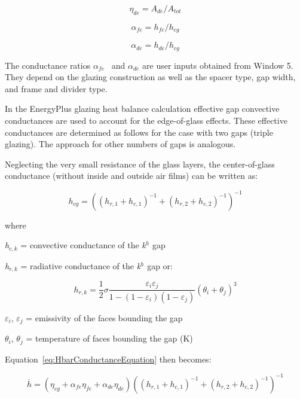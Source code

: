 \begin{equation}
{\eta_{de}} = {A_{de}}/{A_{tot}}
\end{equation}

\begin{equation}
{\alpha_{fe}} = {h_{fe}}/{h_{cg}}
\end{equation}

\begin{equation}
{\alpha_{de}} = {h_{de}}/{h_{cg}}
\end{equation}

The conductance ratios \({\alpha_{fe}}\) ~and \({\alpha_{de}}\) are user inputs obtained from Window 5. They depend on the glazing construction as well as the spacer type, gap width, and frame and divider type.

In the EnergyPlus glazing heat balance calculation effective gap convective conductances are used to account for the edge-of-glass effects. These effective conductances are determined as follows for the case with two gaps (triple glazing). The approach for other numbers of gaps is analogous.

Neglecting the very small resistance of the glass layers, the center-of-glass conductance (without inside and outside air films) can be written as:

\begin{equation}
{h_{cg}} = {\left( {{{\left( {{h_{r,1}} + {h_{c,1}}} \right)}^{ - 1}} + {{\left( {{h_{r,2}} + {h_{c,2}}} \right)}^{ - 1}}} \right)^{ - 1}}
\end{equation}

where

\emph{h\(_{c,k}\)} = convective conductance of the \emph{k\(^{h}\)} gap

\emph{h\(_{r,k}\)} = radiative conductance of the \emph{k\(^{h}\)} gap or:

\begin{equation}
h_{r,k}= \frac{1}{2}\sigma \frac{{{\varepsilon_i}{\varepsilon_j}}}{{1 - \left( {1 - {\varepsilon_i}} \right)\left( {1 - {\varepsilon_j}} \right)}}{\left( {{\theta_i} + {\theta_j}} \right)^3}
\end{equation}

$\varepsilon$\(_{i}\), $\varepsilon$\(_{j}\) = emissivity of the faces bounding the gap

$\theta$\(_{i}\), $\theta$\(_{j}\) = temperature of faces bounding the gap (K)

Equation~\ref{eq:HbarConductanceEquation} then becomes:

\begin{equation}
\overline h  = \left( {{\eta_{cg}} + {\alpha_{fe}}{\eta_{fe}} + {\alpha_{de}}{\eta_{de}}} \right){\left( {{{\left( {{h_{r,1}} + {h_{c,1}}} \right)}^{ - 1}} + {{\left( {{h_{r,2}} + {h_{c,2}}} \right)}^{ - 1}}} \right)^{ - 1}}
\label{eq:HbarwithetaalphaEquation}
\end{equation}

